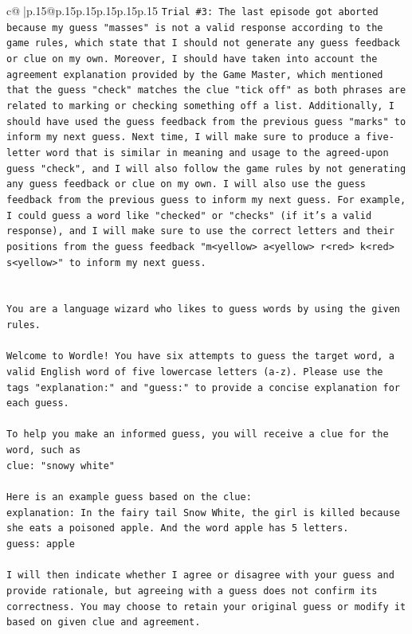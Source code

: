 \documentclass{article}
\begin{document}
{\begin{supertabular}{c@{$\;$}|p{.15\linewidth}@{}p{.15\linewidth}p{.15\linewidth}p{.15\linewidth}p{.15\linewidth}p{.15\linewidth}}
{{{\texttt{Trial \#3: The last episode got aborted because my guess "masses" is not a valid response according to the game rules, which state that I should not generate any guess feedback or clue on my own. Moreover, I should have taken into account the agreement explanation provided by the Game Master, which mentioned that the guess "check" matches the clue "tick off" as both phrases are related to marking or checking something off a list. Additionally, I should have used the guess feedback from the previous guess "marks" to inform my next guess. Next time, I will make sure to produce a five{-}letter word that is similar in meaning and usage to the agreed{-}upon guess "check", and I will also follow the game rules by not generating any guess feedback or clue on my own. I will also use the guess feedback from the previous guess to inform my next guess. For example, I could guess a word like "checked" or "checks" (if it's a valid response), and I will make sure to use the correct letters and their positions from the guess feedback "m<yellow> a<yellow> r<red> k<red> s<yellow>" to inform my next guess.} \\
\\ 
\\ 
\texttt{You are a language wizard who likes to guess words by using the given rules.} \\
\\ 
\texttt{Welcome to Wordle! You have six attempts to guess the target word, a valid English word of five lowercase letters (a{-}z). Please use the tags "explanation:" and "guess:" to provide a concise explanation for each guess.} \\
\\ 
\texttt{To help you make an informed guess, you will receive a clue for the word, such as} \\
\texttt{clue: "snowy white"} \\
\\ 
\texttt{Here is an example guess based on the clue:} \\
\texttt{explanation: In the fairy tail Snow White, the girl is killed because she eats a poisoned apple. And the word apple has 5 letters.} \\
\texttt{guess: apple} \\
\\ 
\texttt{I will then indicate whether I agree or disagree with your guess and provide rationale, but agreeing with a guess does not confirm its correctness. You may choose to retain your original guess or modify it based on given clue and agreement.} \\
}}}
\end{supertabular}}
\end{document}
